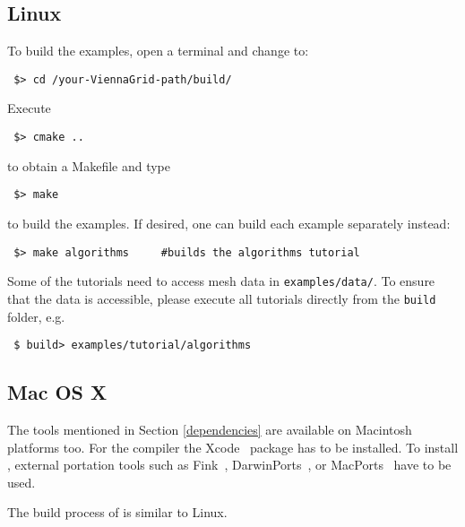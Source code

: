 \subsection{Linux}
To build the examples, open a terminal and change to:

\begin{lstlisting}
 $> cd /your-ViennaGrid-path/build/
\end{lstlisting}
Execute
\begin{lstlisting}
 $> cmake ..
\end{lstlisting}
to obtain a Makefile and type
\begin{lstlisting}
 $> make
\end{lstlisting}
to build the examples. If desired, one can build each example separately instead:
\begin{lstlisting}
 $> make algorithms     #builds the algorithms tutorial
\end{lstlisting}


Some of the tutorials need to access mesh data in \texttt{examples/data/}.
To ensure that the data is accessible, please execute all tutorials directly from the \texttt{build} folder, e.g.

\begin{lstlisting}
 $ build> examples/tutorial/algorithms
\end{lstlisting}

\subsection{Mac OS X}
\label{apple}
The tools mentioned in Section \ref{dependencies} are available on
Macintosh platforms too.
For the {\GCC} compiler the Xcode~\cite{xcode} package has to be installed.
To install {\CMake}, external portation tools such as
Fink~\cite{fink}, DarwinPorts~\cite{darwinports},
or MacPorts~\cite{macports} have to be used.

The build process of {\ViennaGrid} is similar to Linux.

